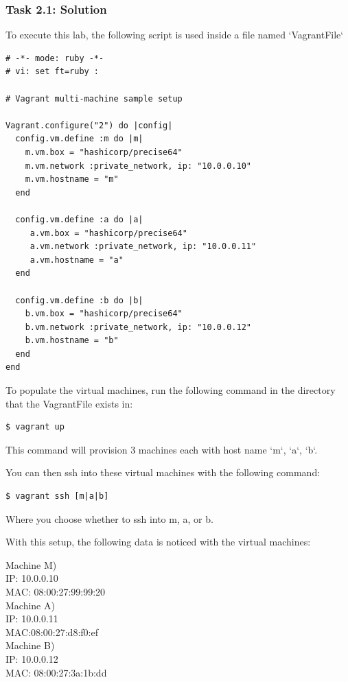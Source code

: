 \documentclass[12pt]{article}
\begin{document}
\subsubsection{Task 2.1: Solution}
To execute this lab, the following script is used inside a file named `VagrantFile`
\begin{verbatim}
# -*- mode: ruby -*-
# vi: set ft=ruby :

# Vagrant multi-machine sample setup

Vagrant.configure("2") do |config|
  config.vm.define :m do |m|
    m.vm.box = "hashicorp/precise64"
    m.vm.network :private_network, ip: "10.0.0.10"
    m.vm.hostname = "m"
  end

  config.vm.define :a do |a|
     a.vm.box = "hashicorp/precise64"
     a.vm.network :private_network, ip: "10.0.0.11"
     a.vm.hostname = "a"
  end

  config.vm.define :b do |b|
    b.vm.box = "hashicorp/precise64"
    b.vm.network :private_network, ip: "10.0.0.12"
    b.vm.hostname = "b"
  end
end
\end{verbatim}

To populate the virtual machines, run the following command in the directory that the VagrantFile exists in:

\begin{verbatim}
$ vagrant up
\end{verbatim}
This command will provision 3 machines each with host name `m`, `a`, `b`.

You can then ssh into these virtual machines with the following command:
\begin{verbatim}
$ vagrant ssh [m|a|b]
\end{verbatim}
Where you choose whether to ssh into m, a, or b.


With this setup, the following data is noticed with the virtual machines:

Machine M) \\
IP: 10.0.0.10 \\
MAC: 08:00:27:99:99:20 \\

Machine A) \\
IP: 10.0.0.11 \\
MAC:08:00:27:d8:f0:ef \\


Machine B) \\
IP: 10.0.0.12 \\
MAC: 08:00:27:3a:1b:dd \\
\end{document}
